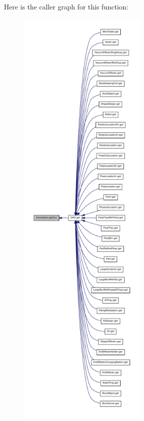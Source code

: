 Here is the caller graph for this function:\nopagebreak
\begin{figure}[H]
\begin{center}
\leavevmode
\includegraphics[height=600pt]{class_connection_a1a452e7d0205cbf773855fe7721a52dd_icgraph}
\end{center}
\end{figure}


